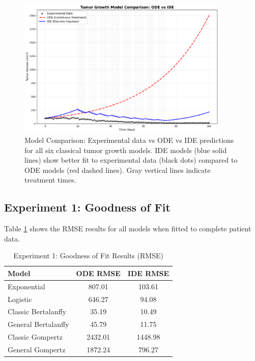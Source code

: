 \documentclass[11pt]{article}
\begin{document}
\begin{figure}[h]
\centering
\includegraphics[width=0.9\textwidth]{graphs/tumor_model_comparison}
\caption{Model Comparison: Experimental data vs ODE vs IDE predictions for all six classical tumor growth models. IDE models (blue solid lines) show better fit to experimental data (black dots) compared to ODE models (red dashed lines). Gray vertical lines indicate treatment times.}
\label{fig:model_comparison}
\end{figure}

\subsection{Experiment 1: Goodness of Fit}

Table \ref{tab:exp1} shows the RMSE results for all models when fitted to complete patient data.

\begin{table}[h]
\centering
\caption{Experiment 1: Goodness of Fit Results (RMSE)}
\label{tab:exp1}
\begin{tabular}{@{}lcc@{}}
\toprule
Model & ODE RMSE & IDE RMSE \\
\midrule
Exponential & 807.01 & 103.61 \\
Logistic & 646.27 & 94.08 \\
Classic Bertalanffy & 35.19 & 10.49 \\
General Bertalanffy & 45.79 & 11.75 \\
Classic Gompertz & 2432.01 & 1448.98 \\
General Gompertz & 1872.24 & 796.27 \\
\bottomrule
\end{tabular}
\end{table}
\end{document}
